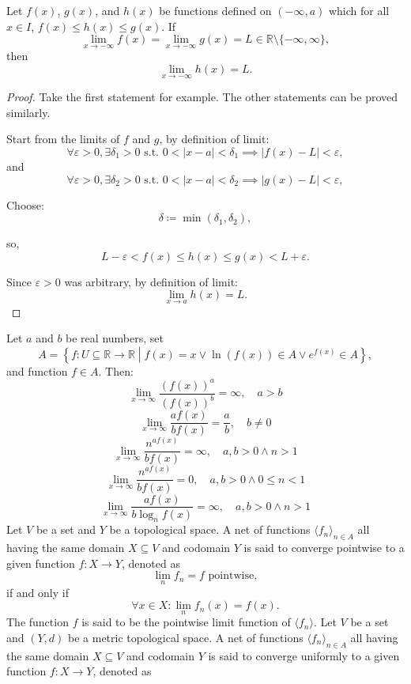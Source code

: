 \documentclass[a4paper,12pt]{report}
\begin{document}
Let $f(x)$, $g(x)$, and $h(x)$ be functions defined on $(-\infty,a)$ which for all $x\in I$, $f(x)\leq h(x)\leq g(x)$. If
\[\lim_{x\to-\infty}f(x)=\lim_{x\to-\infty}g(x)=L\in\mathbb{R}\setminus\{-\infty,\infty\},\]
then
\[\lim_{x\to-\infty}h(x)=L.\]
\begin{proof}
Take the first statement for example. The other statements can be proved similarly.

Start from the limits of $f$ and $g$, by definition of limit:
\[\forall\varepsilon>0, \exists\delta_1>0\text{\ s.t.\ }0<|x-a|<\delta_1\implies|f(x)-L|<\varepsilon,\]
and
\[\forall\varepsilon>0, \exists\delta_2>0\text{\ s.t.\ }0<|x-a|<\delta_2\implies|g(x)-L|<\varepsilon,\]

Choose:
\[\delta\coloneq\min(\delta_1,\delta_2),\]

so,
\[L-\varepsilon<f(x)\leq h(x)\leq g(x)<L+\varepsilon.\]

Since $\varepsilon > 0$ was arbitrary, by definition of limit:
\[\lim_{x\to a}h(x)=L.\]
\end{proof}
Let \( a \) and \( b \) be real numbers, set
\[A=\left\{f\colon U\subseteq\mathbb{R}\to\mathbb{R} \middle | f(x) = x \lor \ln(f(x)) \in A \lor e^{f\left(x\right)}  \in A \right\},\]
and function $f\in A$. Then:
\[\lim_{x \to \infty} \frac{\left(f\left(x\right)\right)^a}{\left(f\left(x\right)\right)^b} = \infty, \quad a > b \]
\[ \lim_{x \to \infty} \frac{af\left(x\right)}{bf\left(x\right)} = \frac{a}{b}, \quad b \neq 0 \]
\[ \lim_{x \to \infty}\frac{n^{af\left(x\right)}}{bf\left(x\right)} = \infty, \quad a,b > 0 \land  n > 1 \]
\[ \lim_{x \to \infty}\frac{n^{af\left(x\right)}}{bf\left(x\right)} = 0, \quad a,b > 0 \land  0\leq n<1 \]
\[ \lim_{x \to \infty}\frac{af\left(x\right)}{b\log_n f\left(x\right)} = \infty, \quad a,b > 0 \land  n > 1 \]
Let $V$ be a set and $Y$ be a topological space. A net of functions $\langle f_n\rangle_{n\in A}$ all having the same domain $X\subseteq V$ and codomain $Y$ is said to converge pointwise to a given function $f\colon X\to Y$, denoted as 
\[\lim_nf_n=f\text{\ pointwise},\]
if and only if
\[\forall x\in X\colon\lim_nf_n(x)=f(x).\]
The function $f$ is said to be the pointwise limit function of $\langle f_n\rangle$.
Let $V$ be a set and $(Y,d)$ be a metric topological space. A net of functions $\langle f_n\rangle_{n\in A}$ all having the same domain $X\subseteq V$ and codomain $Y$ is said to converge uniformly to a given function $f\colon X\to Y$, denoted as 
\end{document}
